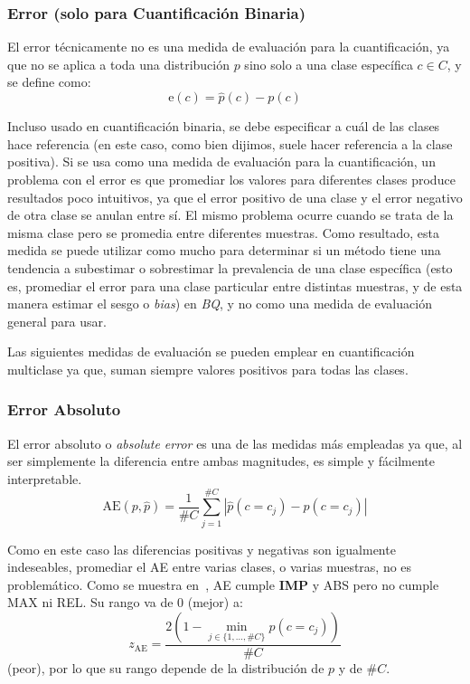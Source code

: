 \subsubsection{Error {\normalfont(solo para Cuantificación
Binaria)}}\label{evaluacion:error}

El error técnicamente no es una medida de evaluación para la cuantificación, ya
que no se aplica a toda una distribución $p$ sino solo a una clase específica $c
\in C$, y se define como:
\begin{equation}
    {\text{e}(c)} = \hat p(c) - p(c)\label{evaluacion:eq_e}
\end{equation}

Incluso usado en cuantificación binaria, se debe especificar a cuál de las
clases hace referencia (en este caso, como bien dijimos, suele hacer referencia
a la clase positiva). Si se usa como una medida de evaluación para la
cuantificación, un problema con el error es que promediar los valores para
diferentes clases produce resultados poco intuitivos, ya que el error positivo
de una clase y el error negativo de otra clase se anulan entre sí. El mismo
problema ocurre cuando se trata de la misma clase pero se promedia entre
diferentes muestras. Como resultado, esta medida se puede utilizar como mucho
para determinar si un método tiene una tendencia a subestimar o sobrestimar la
prevalencia de una clase específica (esto es, promediar el error para una clase
particular entre distintas muestras, y de esta manera estimar el sesgo o {\it
bias}) en {\it BQ}, y no como una medida de evaluación general para usar.

Las siguientes medidas de evaluación se pueden emplear en cuantificación
multiclase ya que, suman siempre valores positivos para todas las clases.

\subsubsection{Error Absoluto}\label{evaluacion:ae}

El error absoluto o {\it absolute error\/} es una de las medidas más empleadas
ya que, al ser simplemente la diferencia entre ambas magnitudes, es simple y
fácilmente interpretable.
\begin{equation}
    {\text{AE}(p, \hat p)} = \frac{1}{\#C}\sum \limits_{j=1}^{\#C}{|\hat p(c=c_j) - p(c=c_j)|}\label{evaluacion:eq_ae}
\end{equation}

Como en este caso las diferencias positivas y negativas son igualmente
indeseables, promediar el AE entre varias clases, o varias muestras, no es
problemático. Como se muestra en~\cite{sebastiani2020evaluation}, AE cumple {\bf
IMP} y ABS pero no cumple MAX ni REL. Su rango va de 0 (mejor) a:
\begin{equation}
    z_{\text{AE}} = \frac{2(1-\displaystyle \min_{j\in\{1,\dots,\#C\}}p(c=c_j))}{\#C}\label{evaluacion:eq_zae}
\end{equation}
(peor), por lo que su rango depende de la distribución de $p$ y de $\#C$.

